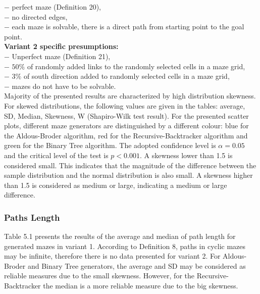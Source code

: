 $-$ perfect maze (Definition 20),\\
$-$ no directed edges,\\
$-$ each maze is solvable, there is a direct path from starting point to the goal point.\\
\newpage
\textbf{Variant 2 specific presumptions: }\\
$-$ Unperfect maze (Definition 21),\\
$-$ $50\%$ of randomly added links to the randomly selected cells in a maze grid,\\
$-$ $3\%$ of south direction added to randomly selected cells in a maze grid,\\
$-$ mazes do not have to be solvable.\\
\newline
Majority of the presented results are characterized by high distribution skewness. For skewed distributions, the following values ​​are given in the tables:
average, SD, Median, Skewness, W (Shapiro-Wilk test result)\cite{34}. For the presented scatter plots, different maze generators are distinguished by a different colour:
blue for the Aldous-Broder algorithm, red for the Recursive-Backtracker algorithm and green for the Binary Tree algorithm. The adopted confidence level is $\alpha = 0.05$ and 
the critical level of the test is $p<0.001$. A skewness lower than 1.5 is considered small. This indicates that the magnitude of the difference between the
sample distribution and the normal distribution is also small. A skewness higher than 1.5 is considered as medium or large, indicating a medium or large difference.\\
\subsubsection{Paths Length}
Table 5.1 presents the results of the average and median of path length for generated mazes in variant 1.
According to Definition 8, paths in cyclic mazes may be infinite, therefore there is no data presented for variant 2. For Aldous-Broder and Binary Tree
generators, the average and SD may be considered as reliable measures due to the small skewness. However, for the Recursive-Backtracker the median is a more 
reliable measure due to the big skewness.
   
